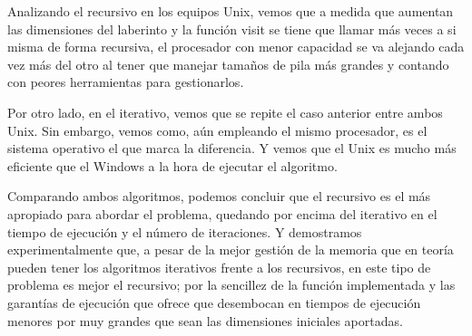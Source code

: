 \documentclass[12pt,a4paper]{article}
\begin{document}
\vspace{0.2cm}
Analizando el recursivo en los equipos Unix, vemos que a medida que aumentan las dimensiones del laberinto y la función visit se tiene que llamar más veces a si misma de forma recursiva, el procesador con menor capacidad se va alejando cada vez más del otro al tener que manejar tamaños de pila más grandes y contando con peores herramientas para gestionarlos.  

\vspace{0.2cm}
Por otro lado, en el iterativo, vemos que se repite el caso anterior entre ambos Unix. Sin embargo, vemos como, aún empleando el mismo procesador, es el sistema operativo el que marca la diferencia. Y vemos que el Unix es mucho más eficiente que el Windows a la hora de ejecutar el algoritmo. 

\vspace{0.2cm}
Comparando ambos algoritmos, podemos concluir que el recursivo es el más apropiado para abordar el problema, quedando por encima del iterativo en el tiempo de ejecución y el número de iteraciones. Y demostramos experimentalmente que, a pesar de la mejor gestión de la memoria que en teoría pueden tener los algoritmos iterativos frente a los recursivos, en este tipo de problema es mejor el recursivo; por la sencillez de la función implementada y las garantías de ejecución que ofrece que desembocan en tiempos de ejecución menores por muy grandes que sean las dimensiones iniciales aportadas. 
\clearpage


\end{document}
